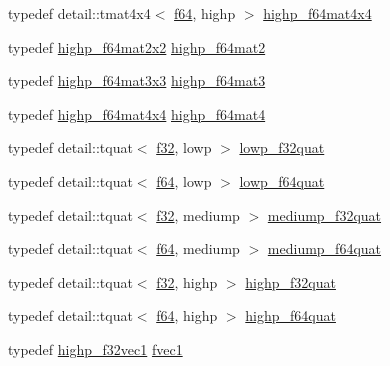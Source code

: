 \begin{CompactItemize}
\item 
typedef detail::tmat4x4$<$ \hyperlink{group__gtc__type__precision_g2bba392e555124b36cde6abba349bab3}{f64}, highp $>$ \hyperlink{group__gtc__type__precision_ga95b52552df369b75d09155ebb29b1bd}{highp\_\-f64mat4x4}
\item 
typedef \hyperlink{group__gtc__type__precision_g4babca568fc88f185620c02e4fdac0d8}{highp\_\-f64mat2x2} \hyperlink{group__gtc__type__precision_g7d9fd446fd43310ba6f63c8f9468acc0}{highp\_\-f64mat2}
\item 
typedef \hyperlink{group__gtc__type__precision_gf520a9307867c632408029a53af3e375}{highp\_\-f64mat3x3} \hyperlink{group__gtc__type__precision_g00c5743b0eba6b437422571f4eda27b8}{highp\_\-f64mat3}
\item 
typedef \hyperlink{group__gtc__type__precision_ga95b52552df369b75d09155ebb29b1bd}{highp\_\-f64mat4x4} \hyperlink{group__gtc__type__precision_g1ac5d0564721a22765c68c54a0a4f87a}{highp\_\-f64mat4}
\item 
typedef detail::tquat$<$ \hyperlink{group__gtc__type__precision_g0ec999b57f5330d9021256e96038df04}{f32}, lowp $>$ \hyperlink{group__gtc__type__precision_g83edc5f21bfa41f72f881b29aabbd919}{lowp\_\-f32quat}
\item 
typedef detail::tquat$<$ \hyperlink{group__gtc__type__precision_g2bba392e555124b36cde6abba349bab3}{f64}, lowp $>$ \hyperlink{group__gtc__type__precision_g225e6f95dd6a7049b1a86db23b90cbac}{lowp\_\-f64quat}
\item 
typedef detail::tquat$<$ \hyperlink{group__gtc__type__precision_g0ec999b57f5330d9021256e96038df04}{f32}, mediump $>$ \hyperlink{group__gtc__type__precision_gb038e3482ca401bca2b2634c96f44f09}{mediump\_\-f32quat}
\item 
typedef detail::tquat$<$ \hyperlink{group__gtc__type__precision_g2bba392e555124b36cde6abba349bab3}{f64}, mediump $>$ \hyperlink{group__gtc__type__precision_g7cf626acf7f4fc29355c147bfe05163d}{mediump\_\-f64quat}
\item 
typedef detail::tquat$<$ \hyperlink{group__gtc__type__precision_g0ec999b57f5330d9021256e96038df04}{f32}, highp $>$ \hyperlink{group__gtc__type__precision_g26eef27d2efbd759e7e93c40672402e9}{highp\_\-f32quat}
\item 
typedef detail::tquat$<$ \hyperlink{group__gtc__type__precision_g2bba392e555124b36cde6abba349bab3}{f64}, highp $>$ \hyperlink{group__gtc__type__precision_g9372e8b60f401fd94aba637b3ed17cfc}{highp\_\-f64quat}
\item 
typedef \hyperlink{group__gtc__type__precision_gc8be8ce31b9df0a5005d7c7458a3d03e}{highp\_\-f32vec1} \hyperlink{group__gtc__type__precision_gb927d62f22fa57461367011950cec650}{fvec1}

\end{CompactItemize}
